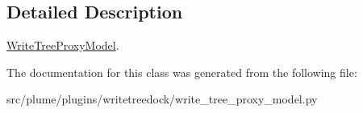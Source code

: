 \subsection{Detailed Description}
\hyperlink{classplume-creator_1_1src_1_1plume_1_1plugins_1_1writetreedock_1_1write__tree__proxy__model_1_1_write_tree_proxy_model}{Write\+Tree\+Proxy\+Model}. 

The documentation for this class was generated from the following file\+:\begin{DoxyCompactItemize}
\item 
src/plume/plugins/writetreedock/write\+\_\+tree\+\_\+proxy\+\_\+model.\+py\end{DoxyCompactItemize}
